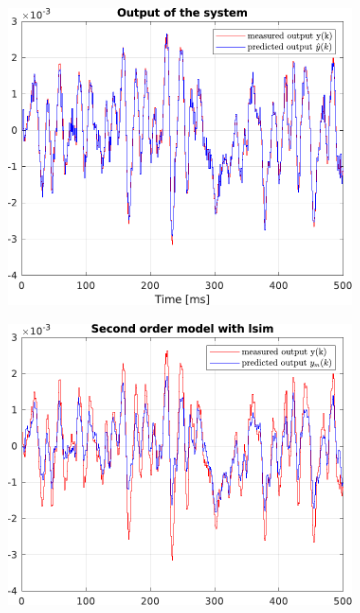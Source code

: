 \documentclass{scrartcl}
\begin{document}
\begin{figure}[h]
	\centering
	\begin{subfigure}{.49\textwidth}
		\includegraphics[width=\textwidth]{figures/output_arx.pdf}
		\label{fig:output_arx}
	\end{subfigure}\hfill
	\begin{subfigure}{.49\textwidth}
		\includegraphics[width=\textwidth]{figures/output_lsim2.pdf}

\end{subfigure}
\end{figure}
\end{document}
